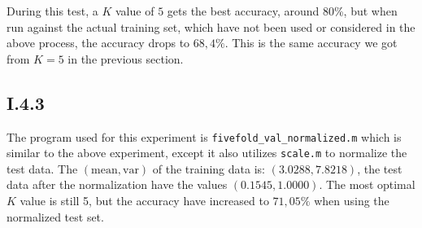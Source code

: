 During this test, a $K$ value of $5$ gets the best accuracy, around 80\%, but
when run against the actual training set, which have not been used or considered
in the above process, the accuracy drops to $68,4\%$. This is the same accuracy
we got from $K=5$ in the previous section.

\subsection{I.4.3}
The program used for this experiment is \texttt{fivefold\_val\_normalized.m}
which is similar to the above experiment, except it also utilizes
\texttt{scale.m} to normalize the test data.  The $(\text{mean},\text{var})$ of
the training data is: $(3.0288,7.8218)$, the test data after the normalization
have the values $(0.1545,1.0000)$. The most optimal $K$ value is still 5, but
the accuracy have increased to $71,05\%$ when using the normalized test set.
